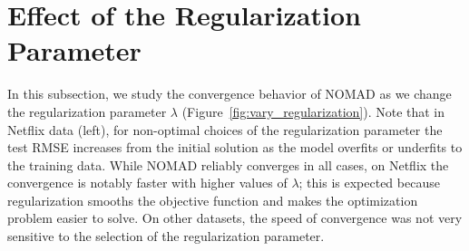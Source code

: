 \documentclass{vldb}
\begin{document}

  

\newpage
\appendix

\section{Effect of the Regularization Parameter}
\label{sec:EffectRegulParam}

In this subsection, we study the convergence behavior of NOMAD as we
change the regularization parameter $\lambda$
(Figure~\ref{fig:vary_regularization}).  Note that in Netflix data
(left), for non-optimal choices of the regularization parameter the
test RMSE increases from the initial solution as the model overfits or
underfits to the training data.  While NOMAD reliably converges in all
cases, on Netflix the convergence is notably faster with
higher values of $\lambda$; this is expected because regularization
smooths the objective function and makes the optimization problem
easier to solve.  On other datasets, the speed of convergence was not
very sensitive to the selection of the regularization parameter.
\end{document}
